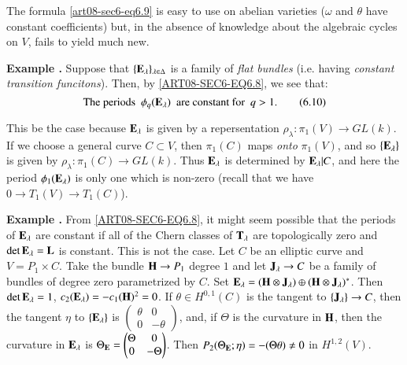 \begin{remark*}
The formula \eqref{art08-sec6-eq6.9} is easy to use on abelian varieties ($\omega$ and $\theta$ have constant coefficients) but, in the absence of knowledge about the algebraic cycles on $V$, fails to yield much new.
\end{remark*}

\medskip
\noindent
{\bf Example .\label{art08-sec6-exam2}}
Suppose that $\{\mathbf{E}_{\lambda}\}_{\lambda\in \Delta}$ is a family of {\em flat bundles} (i.e. having {\em constant transition funcitons}). Then, by \eqref{ART08-SEC6-EQ6.8}, we see that:
\begin{equation*}
\text{The periods~ } \phi_{q}(\mathbf{E}_{\lambda})\text{~ are constant for~ } q>1.\tag{6.10}\label{art08-sec6-eq6.10}
\end{equation*}

\begin{remark*}
This be the case because $\mathbf{E}_{\lambda}$ is given by a repersentation $\rho_{\lambda}:\pi_{1}(V)\to GL(k)$. If we choose a general curve $C\subset V$, then $\pi_{1}(C)$ maps {\em onto} $\pi_{1}(V)$, and so $\{\mathbf{E}_{\lambda}\}$ is given by $\rho_{\lambda}:\pi_{1}(C)\to GL(k)$. Thus $\mathbf{E}_{\lambda}$ is determined by $\mathbf{E}_{\lambda}|C$, and here the period $\phi_{1}(\mathbf{E}_{\lambda})$ is only one which is non-zero (recall that we have $0\to T_{1}(V)\to T_{1}(C)$).
\end{remark*}

\medskip
\noindent
{\bf Example .\label{art08-sec6-exam3}}
From \eqref{ART08-SEC6-EQ6.8}, it might seem possible that the periods of $\mathbf{E}_{\lambda}$ are constant if all of the Chern classes of $\mathbf{T}_{\lambda}$ are topologically zero and $\det \mathbf{E}_{\lambda}=\mathbf{L}$ is constant. This is not the case. Let $C$ be an elliptic curve and $V=P_{1}\times C$. Take the bundle $\mathbf{H}\to P_{1}$ degree $1$ and let $\mathbf{J}_{\lambda}\to C$ be a family of bundles of degree zero parametrized by $C$. Set $\mathbf{E}_{\lambda}=(\mathbf{H}\otimes \mathbf{J}_{\lambda})\oplus (\mathbf{H}\otimes \mathbf{J}_{\lambda})^{*}$. Then $\det \mathbf{E}_{\lambda}=1$, $c_{2}(\mathbf{E}_{\lambda})=-c_{1}(\mathbf{H})^{2}=0$. If $\theta\in H^{0,1}(C)$ is the tangent to $\{\mathbf{J}_{\lambda}\}\to C$, then the tangent $\eta$ to $\{\mathbf{E}_{\lambda}\}$ is $\left(\begin{matrix} \theta & 0\\ 0 & -\theta\end{matrix}\right)$, and, if $\Theta$ is the curvature in $\mathbf{H}$, then the curvature in $\mathbf{E}_{\lambda}$ is $\Theta_{\mathbf{E}}=\left(\begin{matrix} \Theta & 0\\ 0 & -\Theta\end{matrix}\right)$. Then $P_{2}(\Theta_{\mathbf{E}};\eta)=-(\Theta\theta)\neq 0$ in $H^{1,2}(V)$.

